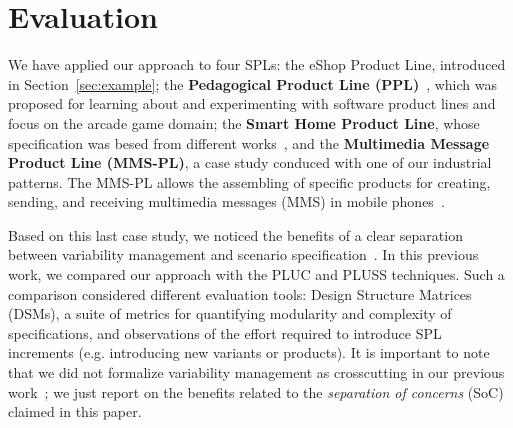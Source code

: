 \documentclass{acm_proc_article-sp}
\begin{document}
% 
% 
% 
% 


\section{Evaluation}
\label{sec:evaluation}

We have applied our approach to four SPLs: the eShop Product Line, introduced in
Section~\ref{sec:example}; the {\bf Pedagogical Product Line
(PPL)}~\cite{ppl-url}, which was proposed for learning about and experimenting
with software product lines and focus on the arcade game domain; the {\bf Smart
Home Product Line}, whose specification was besed from different
works~\cite{Pohl:2005aa}, and the {\bf Multimedia Message Product Line (MMS-PL)},
a case study conduced with one of our industrial patterns. The MMS-PL allows the
assembling of specific products for creating, sending, and receiving multimedia
messages (MMS) in mobile phones~\cite{Bonifacio:2008aa}.

Based on this last case study, we noticed the benefits of a clear separation
between variability management and scenario
specification~\cite{Bonifacio:2008aa}. In this previous work, we compared our
approach with the PLUC and PLUSS techniques. Such a comparison considered
different evaluation tools: Design Structure Matrices (DSMs), a suite of metrics
for quantifying modularity and complexity of specifications, and observations of
the effort required to introduce SPL increments (e.g. introducing new variants or
products). It is important to note that we did not formalize variability
management as crosscutting in our previous work~\cite{Bonifacio:2008aa}; we just
report on the benefits related to the \emph{separation of concerns} (SoC) claimed
in this paper.
\end{document}
